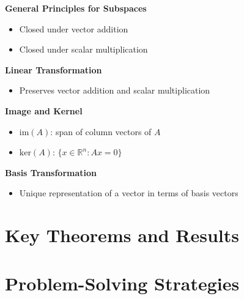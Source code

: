 \documentclass[8pt, a4paper, landscape]{extarticle}
\begin{document}
\begin{multicols*}{3}
\textbf{General Principles for Subspaces}
\begin{itemize}
    \item Closed under vector addition
    \item Closed under scalar multiplication
\end{itemize}

\textbf{Linear Transformation}
\begin{itemize}
    \item Preserves vector addition and scalar multiplication
\end{itemize}

\textbf{Image and Kernel}
\begin{itemize}
    \item $\text{im}(A)$: span of column vectors of $A$
    \item $\text{ker}(A)$: $\{x \in \mathbb{R}^n : Ax = 0\}$
\end{itemize}

\textbf{Basis Transformation}
\begin{itemize}
    \item Unique representation of a vector in terms of basis vectors
\end{itemize}

\columnbreak


\section*{Key Theorems and Results}
\columnbreak

\section*{Problem-Solving Strategies}
\end{multicols*}

\end{document}
